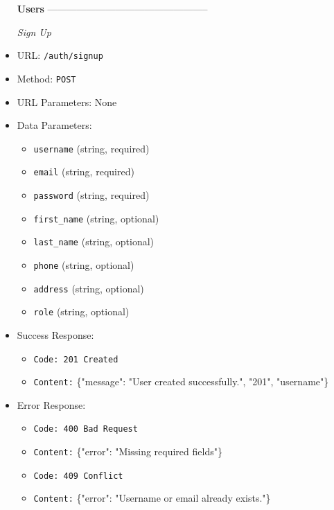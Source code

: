 \begin{itemize}



  \item[\textbf{Users}] --------------------------------------------------

  \item[\textit{Sign Up}]
  \item URL: \texttt{/auth/signup}  
  \item Method: \texttt{POST}  
  \item URL Parameters: None  
  \item Data Parameters:
  \begin{itemize}
    \item \texttt{username} (string, required)
    \item \texttt{email} (string, required)
    \item \texttt{password} (string, required)
    \item \texttt{first\_name} (string, optional)
    \item \texttt{last\_name} (string, optional)
    \item \texttt{phone} (string, optional)
    \item \texttt{address} (string, optional)
    \item \texttt{role} (string, optional)
  \end{itemize}
  \item Success Response:
  \begin{itemize}
    \item \texttt{Code: 201 Created}  
    \item \texttt{Content:} \{"message": "User created successfully.", "201", "username"\}
  \end{itemize}
  \item Error Response:
  \begin{itemize}
    \item \texttt{Code: 400 Bad Request}  
    \item \texttt{Content:} \{"error": "Missing required fields"\}
    \item \texttt{Code: 409 Conflict}  
    \item \texttt{Content:} \{"error": "Username or email already exists."\}
  \end{itemize}
  

\end{itemize}
